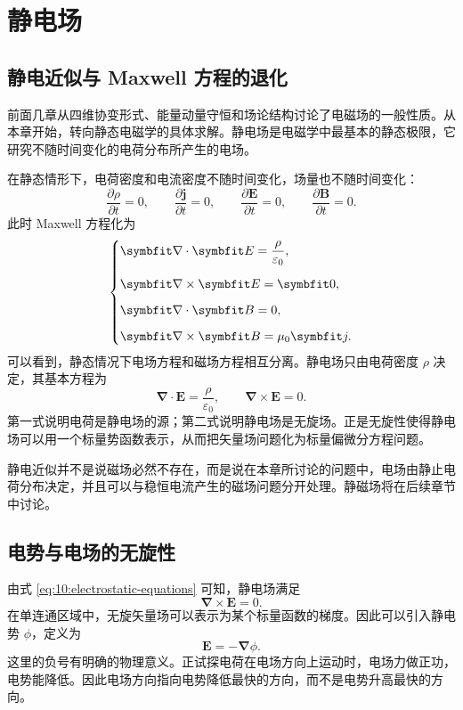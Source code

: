 \chapter{静电场}

\section{静电近似与 Maxwell 方程的退化}

前面几章从四维协变形式、能量动量守恒和场论结构讨论了电磁场的一般性质。从本章开始，转向静态电磁学的具体求解。静电场是电磁学中最基本的静态极限，它研究不随时间变化的电荷分布所产生的电场。

在静态情形下，电荷密度和电流密度不随时间变化，场量也不随时间变化：
\[
\frac{\partial \rho}{\partial t}=0,
\qquad
\frac{\partial \bm{j}}{\partial t}=0,
\qquad
\frac{\partial \bm{E}}{\partial t}=0,
\qquad
\frac{\partial \bm{B}}{\partial t}=0.
\]
此时 Maxwell 方程化为
\begin{equation}
	\begin{dcases}
		\bm{\nabla}\cdot\bm{E}=\frac{\rho}{\varepsilon_{0}}, \\[6pt]
		\bm{\nabla}\times\bm{E}=\bm{0}, \\[6pt]
		\bm{\nabla}\cdot\bm{B}=0, \\[6pt]
		\bm{\nabla}\times\bm{B}=\mu_{0}\bm{j}.
	\end{dcases}
\end{equation}
可以看到，静态情况下电场方程和磁场方程相互分离。静电场只由电荷密度 $\rho$ 决定，其基本方程为
\begin{equation}
	\bm{\nabla}\cdot\bm{E}
	=
	\frac{\rho}{\varepsilon_{0}},
	\qquad
	\bm{\nabla}\times\bm{E}=0.
	\label{eq:10:electrostatic-equations}
\end{equation}
第一式说明电荷是静电场的源；第二式说明静电场是无旋场。正是无旋性使得静电场可以用一个标量势函数表示，从而把矢量场问题化为标量偏微分方程问题。

静电近似并不是说磁场必然不存在，而是说在本章所讨论的问题中，电场由静止电荷分布决定，并且可以与稳恒电流产生的磁场问题分开处理。静磁场将在后续章节中讨论。

\section{电势与电场的无旋性}

由式 \eqref{eq:10:electrostatic-equations} 可知，静电场满足
\[
\bm{\nabla}\times\bm{E}=0.
\]
在单连通区域中，无旋矢量场可以表示为某个标量函数的梯度。因此可以引入静电势 $\phi$，定义为
\begin{equation}
	\bm{E}
	=
	-\bm{\nabla}\phi.
	\label{eq:10:e-potential}
\end{equation}
这里的负号有明确的物理意义。正试探电荷在电场方向上运动时，电场力做正功，电势能降低。因此电场方向指向电势降低最快的方向，而不是电势升高最快的方向。

